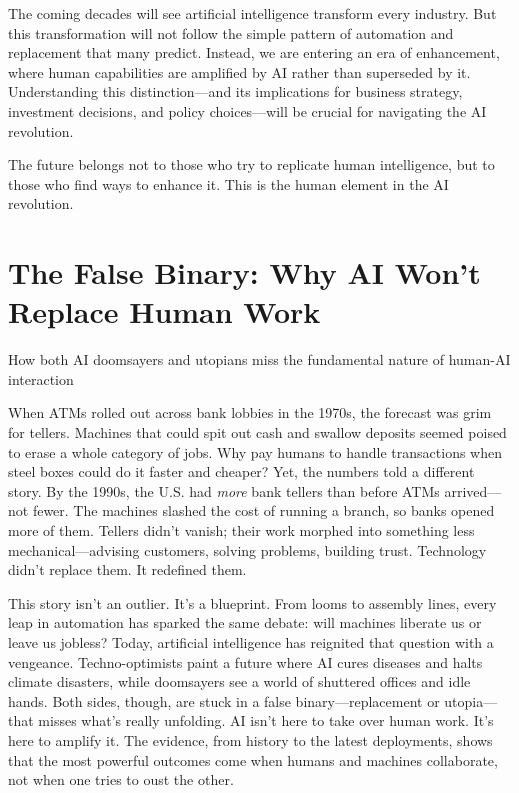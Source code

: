 \documentclass[
  Letterpaper,
]{scrbook}
\begin{document}
The coming decades will see artificial intelligence transform every
industry. But this transformation will not follow the simple pattern of
automation and replacement that many predict. Instead, we are entering
an era of enhancement, where human capabilities are amplified by AI
rather than superseded by it. Understanding this distinction---and its
implications for business strategy, investment decisions, and policy
choices---will be crucial for navigating the AI revolution.

The future belongs not to those who try to replicate human intelligence,
but to those who find ways to enhance it. This is the human element in
the AI revolution.


\chapter{The False Binary: Why AI Won't Replace Human
Work}\label{the-false-binary-why-ai-wont-replace-human-work}

How both AI doomsayers and utopians miss the fundamental nature of
human-AI interaction

\hfill\break

When ATMs rolled out across bank lobbies in the 1970s, the forecast was
grim for tellers. Machines that could spit out cash and swallow deposits
seemed poised to erase a whole category of jobs. Why pay humans to
handle transactions when steel boxes could do it faster and cheaper?
Yet, the numbers told a different story. By the 1990s, the U.S. had
\emph{more} bank tellers than before ATMs arrived---not fewer. The
machines slashed the cost of running a branch, so banks opened more of
them. Tellers didn't vanish; their work morphed into something less
mechanical---advising customers, solving problems, building trust.
Technology didn't replace them. It redefined them.

This story isn't an outlier. It's a blueprint. From looms to assembly
lines, every leap in automation has sparked the same debate: will
machines liberate us or leave us jobless? Today, artificial intelligence
has reignited that question with a vengeance. Techno-optimists paint a
future where AI cures diseases and halts climate disasters, while
doomsayers see a world of shuttered offices and idle hands. Both sides,
though, are stuck in a false binary---replacement or utopia---that
misses what's really unfolding. AI isn't here to take over human work.
It's here to amplify it. The evidence, from history to the latest
deployments, shows that the most powerful outcomes come when humans and
machines collaborate, not when one tries to oust the other.
\end{document}
